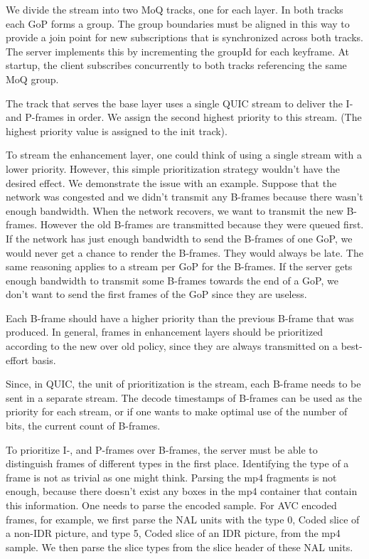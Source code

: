 We divide the stream into two MoQ tracks, one for each layer. In both tracks each GoP forms a group. The group boundaries must be aligned in this way to provide a join point for new subscriptions that is synchronized across both tracks. The server implements this by incrementing the groupId for each keyframe. At startup, the client subscribes concurrently to both tracks referencing the same MoQ group.

The track that serves the base layer uses a single QUIC stream to deliver the I- and P-frames in order. 
We assign the second highest priority to this stream. (The highest priority value is assigned to the
init track).

To stream the enhancement layer, one could think of using a single stream with a lower priority. However, this simple prioritization strategy wouldn't have the desired effect. We demonstrate the issue with an example. Suppose that the network was congested and we didn't transmit any B-frames because there wasn't enough bandwidth. When the network recovers, we want to transmit the new B-frames. However the old B-frames are transmitted because they were queued first. If the network has just enough bandwidth to send the B-frames of one GoP, we would never get a chance to render the B-frames. They would always be late. The same reasoning applies to a stream per GoP for the B-frames. If the server gets enough bandwidth to transmit some B-frames towards the end of a GoP, we don't want to send the first frames of the GoP since they are useless. 

Each B-frame should have a higher priority than the previous B-frame that was produced. In general, frames in enhancement layers should be prioritized according to the new over old policy, since they are always transmitted on a best-effort basis. 

Since, in QUIC, the unit of prioritization is the stream, each B-frame needs to be sent in a separate stream. The decode timestamps of B-frames can be used as the priority for each stream, or if one wants to make optimal use of the number of bits, the current count of B-frames.

To prioritize I-, and P-frames over B-frames, the server must be able to distinguish frames of different types in the first place. Identifying the type of a frame is not as trivial as one might think. Parsing the mp4 fragments is not enough, because there doesn't exist any boxes in the mp4 container that contain this information. One needs to parse the encoded sample. For AVC encoded frames, for example, we first parse the \ac{NAL} units with the type 0, Coded slice of a non-IDR picture, and type 5, Coded slice of an IDR picture, from the mp4 sample. We then parse the slice types from the slice header of these NAL units.

